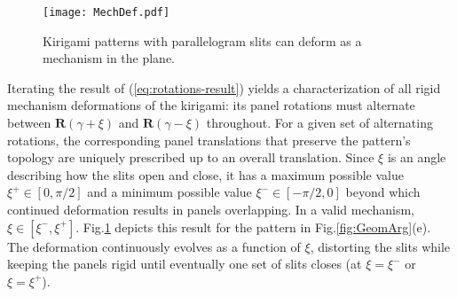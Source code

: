\documentclass[aps,11pt,tightenlines,notitlepage,superscriptaddress,longbibliography,nofootinbib]{revtex4-1}
\begin{document}


\begin{figure}[b]
\centering
\texttt{[image: MechDef.pdf]}
\caption{Kirigami patterns with parallelogram slits  can deform as a mechanism in the plane.}
\label{fig:MechDef}
\end{figure}

Iterating the result of (\ref{eq:rotations-result}) yields a characterization of all rigid mechanism deformations of the kirigami: its panel rotations must alternate between $\mathbf{R}(\gamma + \xi)$ and $\mathbf{R}(\gamma -\xi)$ throughout. For a given set of alternating rotations, the corresponding panel translations that preserve the pattern's topology are uniquely prescribed up to an overall translation. Since $\xi$ is an angle describing how the slits open and close, it has a maximum possible value $\xi^{+} \in [0, \pi/2]$ and a minimum possible value $\xi^{-} \in [-\pi/2, 0]$ beyond which continued deformation results in  panels overlapping. In a valid mechanism, $\xi \in [\xi^{-}, \xi^+]$. Fig.\;\ref{fig:MechDef} depicts this result for the pattern in Fig.\;\ref{fig:GeomArg}(e).  The deformation continuously evolves as a function of $\xi$, distorting the slits while keeping the panels rigid until eventually one set of slits closes (at $\xi=\xi^-$ or $\xi=\xi^+$). %
\end{document}
